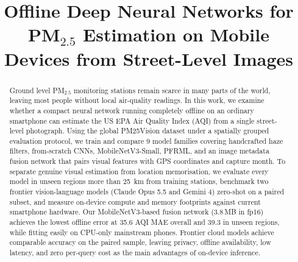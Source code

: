 \documentclass[conference]{IEEEtran}
\newcommand{\pmtwofive}{PM$_{2.5}$}
\begin{document}
\title{
  Offline Deep Neural Networks for \pmtwofive{} Estimation on Mobile Devices
  from Street-Level Images
}

\author{
  \and {}
  \and {}
}

\maketitle

\begin{abstract}
  Ground level \pmtwofive{} monitoring stations remain scarce in many parts of
  the world, leaving most people without local air-quality readings. In this
  work, we examine whether a compact neural network running completely offline
  on an ordinary smartphone can estimate the US EPA Air Quality Index (AQI) from
  a single street-level photograph. Using the global PM25Vision dataset under a
  spatially grouped evaluation protocol, we train and compare 9 model families
  covering handcrafted haze filters, from-scratch CNNs, MobileNetV3-Small,
  PFRML, and an image metadata fusion network that pairs visual features with
  GPS coordinates and capture month. To separate genuine visual estimation from
  location memorisation, we evaluate every model in unseen regions more than
  25~km from training stations, benchmark two frontier vision-language models
  (Claude Opus 5.5 and Gemini 4) zero-shot on a paired subset, and measure
  on-device compute and memory footprints against current smartphone hardware.
  Our MobileNetV3-based fusion network (3.8\,MB in fp16) achieves the lowest
  offline error at 35.6 AQI MAE overall and 39.3 in unseen regions, while
  fitting easily on CPU-only mainstream phones. Frontier cloud models achieve
  comparable accuracy on the paired sample, leaving privacy, offline
  availability, low latency, and zero per-query cost as the main advantages of
  on-device inference.
\end{abstract}
\end{document}

